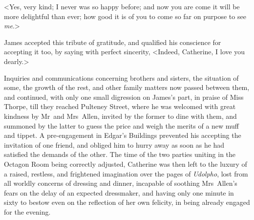  <Yes, very kind; I never was so happy before; and now you are come it will be more delightful than ever; how good it is of you to come so far on purpose to see \textit{me}.> 

 James accepted this tribute of gratitude, and qualified his conscience for accepting it too, by saying with perfect sincerity, <Indeed, Catherine, I love you dearly.> 

 Inquiries and communications concerning brothers and sisters, the situation of some, the growth of the rest, and other family matters now passed between them, and continued, with only one small digression on James's part, in praise of Miss Thorpe, till they reached Pulteney Street, where he was welcomed with great kindness by Mr~and Mrs~Allen, invited by the former to dine with them, and summoned by the latter to guess the price and weigh the merits of a new muff and tippet. A pre-engagement in Edgar's Buildings prevented his accepting the invitation of one friend, and obliged him to hurry away as soon as he had satisfied the demands of the other. The time of the two parties uniting in the Octagon Room being correctly adjusted, Catherine was then left to the luxury of a raised, restless, and frightened imagination over the pages of \textit{Udolpho}, lost from all worldly concerns of dressing and dinner, incapable of soothing Mrs~Allen's fears on the delay of an expected dressmaker, and having only one minute in sixty to bestow even on the reflection of her own felicity, in being already engaged for the evening. 